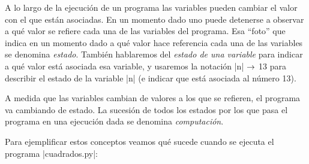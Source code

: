 A lo largo de la ejecución de un programa las variables pueden
cambiar el valor con el que están asociadas. En un momento dado
uno puede detenerse a observar a qué valor se refiere cada una de
las variables del programa. Esa ``foto'' que indica en un momento dado
a qué valor hace referencia cada una de las variables se denomina
{\it estado}. También hablaremos del {\it estado de una variable}
para indicar a qué valor está asociada esa variable, y usaremos la
notación |n| $\rightarrow$ 13 para describir el estado de la variable |n| (e indicar
que está asociada al número 13).

A medida que las variables cambian de valores a los que se
refieren, el programa va cambiando de estado. La sucesión de todos
los estados por los que pasa el programa en una ejecución dada se
denomina {\it computación}.

Para ejemplificar estos conceptos veamos qué sucede cuando se
ejecuta el programa |cuadrados.py|:

